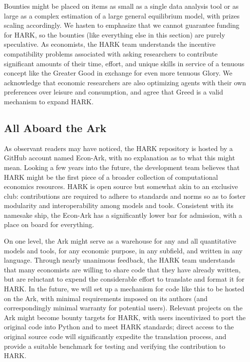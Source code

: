 \documentclass[12pt,titlepage,letterpaper]{econtex}
\begin{document}
Bounties might be placed on items as small as a single data analysis tool or as large as a complex estimation of a large general equilibrium model, with prizes scaling accordingly.  We hasten to emphasize that we cannot guarantee funding for HARK, so the bounties (like everything else in this section) are purely speculative.  As economists, the HARK team understands the incentive compatibility problems associated with asking researchers to contribute significant amounts of their time, effort, and unique skills in service of a tenuous concept like the Greater Good in exchange for even more tenuous Glory.  We acknowledge that economic researchers are also optimizing agents with their own preferences over leisure and consumption, and agree that Greed is a valid mechanism to expand HARK. 

\subsection{All Aboard the Ark}\label{sec:AllAboardTheArk}

As observant readers may have noticed, the HARK repository is hosted by a GitHub account named Econ-Ark, with no explanation as to what this might mean.  Looking a few years into the future, the development team believes that HARK might be the first piece of a broader collection of computational economics resources.  HARK is open source but somewhat akin to an exclusive club: contributions are required to adhere to standards and norms so as to foster modularity and interoperability among models and tools.  Consistent with its namesake ship, the Econ-Ark has a significantly lower bar for admission, with a place on board for everything.

On one level, the Ark might serve as a warehouse for any and all quantitative models and tools, for any economic purpose, in any subfield, and written in any language.  Through nearly unanimous feedback, the HARK team understands that many economists are willing to share code that they have already written, but are reluctant to expend the considerable effort to translate and format it for HARK.  In the future, we will set up a mechanism for code like this to be hosted on the Ark, with minimal requirements imposed on its authors (and correspondingly minimal warranty for potential users).  Relevant projects on the Ark might become bounty targets for HARK, with users incentivized to port the original code into Python and to meet HARK standards; direct access to the original source code will significantly expedite the translation process, and provide a suitable benchmark for testing and verifying the contribution to HARK.
\end{document}
